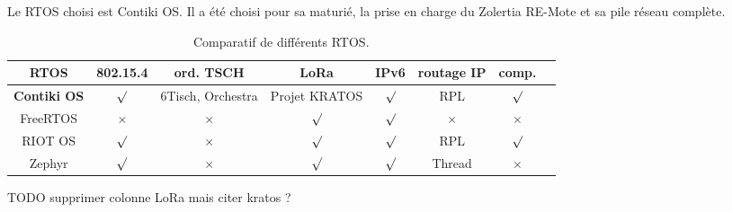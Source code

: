 Le RTOS choisi est Contiki OS. Il a été choisi pour sa maturié, la prise en charge du Zolertia RE-Mote et sa pile réseau complète.


\begin{table}[H]
    \begin{adjustbox}{width=\textwidth}
        \begin{tabular}{c||c|c|c|c|c|c|c}
            RTOS & 802.15.4 & ord. TSCH & LoRa & IPv6 & routage IP & comp. \\ \hline

            \textbf{Contiki OS} & $\surd$  & 6Tisch, Orchestra & Projet KRATOS & $\surd$ & RPL        & $\surd$ \\ \hline

            FreeRTOS            & $\times$ & $\times$          & $\surd$       & $\surd$ & $\times$   &    $\times$     \\ \hline

            RIOT OS             & $\surd$  & $\times$          & $\surd$       & $\surd$ & RPL        &    $\surd$     \\ \hline

            Zephyr              & $\surd$  & $\times$          & $\surd$       & $\surd$ & Thread     &    $\times$     \\
        \end{tabular}
    \end{adjustbox}
    \caption{Comparatif de différents RTOS.}
    \label{tb:state-rtos-choice}
\end{table}
TODO supprimer colonne LoRa mais citer kratos ? 